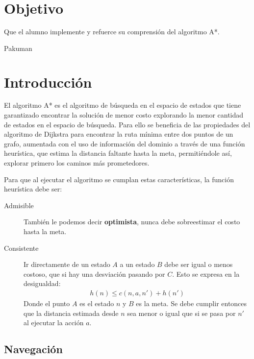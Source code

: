 
\section{Objetivo}

Que el alumno implemente y refuerce su comprensión del algoritmo A*.


\begin{auxcode}
 \caption{Pakuman}
 \centering
\end{auxcode}

\section{Introducci\'on}

El algoritmo A* es el algoritmo de búsqueda en el espacio de estados que tiene garantizado encontrar la solución de menor costo explorando la menor cantidad de estados en el espacio de búsqueda.  Para ello se beneficia de las propiedades del algoritmo de Dijkstra para encontrar la ruta mínima entre dos puntos de un grafo, aumentada con el uso de información del dominio a través de una función heurística, que estima la distancia faltante hasta la meta, permitiéndole así, explorar primero los caminos más prometedores.

Para que al ejecutar el algoritmo se cumplan estas características, la función heurística debe ser:
\begin{description}
 \item [Admisible] También le podemos decir \textbf{optimista}, nunca debe sobreestimar el costo hasta la meta.

 \item [Consistente] Ir directamente de un estado $A$ a un estado $B$ debe ser igual o menos costoso, que si hay una desviación pasando por $C$.  Esto se expresa en la desigualdad:
 \begin{align*}
  h(n) \leq c(n,a,n') + h (n')
 \end{align*}
 Donde el punto $A$ es el estado $n$ y $B$ es la meta.  Se debe cumplir entonces que la distancia estimada desde $n$ sea menor o igual que si se pasa por $n'$ al ejecutar la acción $a$.
\end{description}



\subsection{Navegación}

